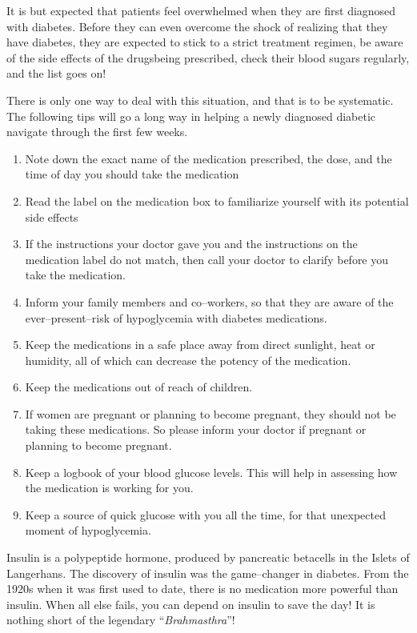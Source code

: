
It is but expected that patients feel overwhelmed when they are first diagnosed with diabetes. Before they can even overcome the shock of realizing that they have diabetes, they are expected to stick to a strict treatment regimen, be aware of the side effects of the drugs\break being prescribed, check their blood sugars regularly, and the list goes on!

There is only one way to deal with this situation, and that is to be systematic. The following tips will go a long way in helping a newly diagnosed diabetic navigate through the first few weeks.

\begin{enumerate}[•]
\itemsep=0pt
\item Note down the exact name of the medication prescribed, the dose, and the time of day you should take the medication
\item Read the label on the medication box to familiarize yourself with its potential side effects
\item If the instructions your doctor gave you and the instructions on the medication label do not match, then call your doctor to clarify before you take the medication.
\item Inform your family members and co–workers, so that they are aware of the ever–present–risk of hypoglycemia with diabetes medications.
\item Keep the medications in a safe place away from direct sunlight, heat or humidity, all of which can decrease the potency of the medication.
\item Keep the medications out of reach of children.
\item If women are pregnant or planning to become pregnant, they should not be taking these medications. So please inform your doctor if pregnant or planning to become pregnant.
\item Keep a logbook of your blood glucose levels. This will help in asse\-ssing how the medication is working for you.
\item Keep a source of quick glucose with you all the time, for that un\-expected moment of hypoglycemia.
\end{enumerate}


Insulin is a polypeptide hormone, produced by pancreatic beta\break cells in the Islets of Langerhans. The discovery of insulin was the game–changer in diabetes. From the 1920s when it was first used to date, there is no medication more powerful than insulin. When all else fails, you can depend on insulin to save the day! It is nothing short of the legendary “\textit{Brahmasthra}”!

